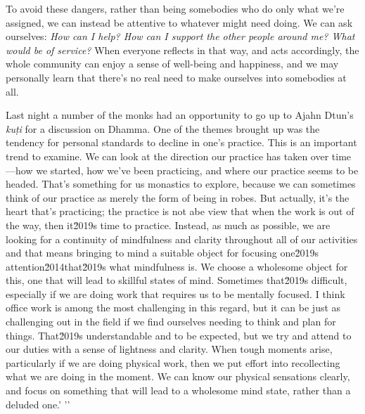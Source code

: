 To avoid these dangers, rather than being somebodies who do only what 
we're assigned, we can instead be attentive to whatever might need 
doing. We can ask ourselves: \emph{How can I help? How can I support 
the other people around me? What would be of service?} When everyone 
reflects in that way, and acts accordingly, the whole community can 
enjoy a sense of well-being and happiness, and we may personally learn 
that there's no real need to make ourselves into somebodies at all.


Last night a number of the monks had an opportunity to go up to Ajahn 
Dtun's \emph{kuṭi} for a discussion on Dhamma. One of the themes 
brought up was the tendency for personal standards to decline in one's 
practice. This is an important trend to examine. We can look at the 
direction our practice has taken over time---how we started, how we've 
been practicing, and where our practice seems to be headed. That's 
something for us monastics to explore, because we can sometimes think 
of our practice as merely the form of being in robes. But actually, 
it's the heart that's practicing; the practice is not abe view that when the work is out of the way, then it\u2019s time to practice. Instead, as much as possible, we are looking for a continuity of mindfulness and clarity throughout all of our activities and that means bringing to mind a suitable object for focusing one\u2019s attention\u2014that\u2019s what mindfulness is. We choose a wholesome object for this, one that will lead to skillful states of mind. Sometimes that\u2019s difficult, especially if we are doing work that requires us to be mentally focused. I think office work is among the most challenging in this regard, but it can be just as challenging out in the field if we find ourselves needing to think and plan for things. That\u2019s understandable and to be expected, but we try and attend to our duties with a sense of lightness and clarity. When tough moments arise, particularly if we are doing physical work, then we put effort into recollecting what we are doing in the moment. We can know our physical sensations clearly, and focus on something that will lead to a wholesome mind state, rather than a deluded one.'
'\n'
